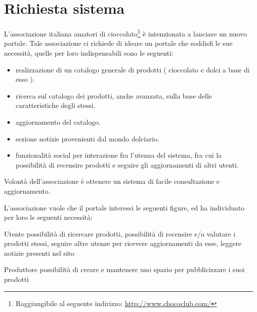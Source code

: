 \chapter{Richiesta sistema}

L’associazione italiana amatori di cioccolato\footnote{Raggiungibile al seguente indirizzo: \url{http://www.chococlub.com/}} è intenzionata a lanciare un nuovo portale.
Tale associazione ci richiede di ideare un portale che soddisfi le sue necessità, quelle per loro indispensabili sono le seguenti:
\begin{itemize}
	\item realizzazione di un catalogo generale di prodotti ( cioccolato e dolci a base di esso ).
	\item ricerca sul catalogo dei prodotti, anche avanzata, sulla base delle caratteristiche degli stessi.
	\item aggiornamento del catalogo.
	\item sezione notizie provenienti dal mondo dolciario.
	\item funzionalità social per interazione fra l'utenza del sistema, fra cui la possibilità di recensire prodotti e seguire gli aggiornamenti di altri utenti.
\end{itemize}
Volontà dell'associazione è ottenere un sistema di facile consultazione e aggiornamento.

L'associazione vuole che il portale interessi le seguenti figure, ed ha individuato per loro le seguenti necessità:
\begin{descriptionInd}
	\item[Utente] possibilità di ricercare prodotti, possibilità di recensire e/o valutare i prodotti stessi, seguire altre utenze per ricevere aggiornamenti da esse, leggere notizie presenti nel sito
	\item[Produttore] possibilità di creare e mantenere uno spazio per pubblicizzare i suoi prodotti
\end{descriptionInd}




